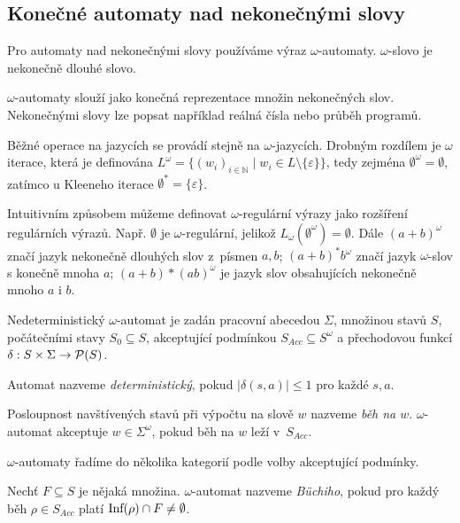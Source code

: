 \subsection{Konečné automaty nad nekonečnými slovy}


Pro automaty nad nekonečnými slovy používáme výraz $\omega$-automaty.
$\omega$-slovo je nekonečně dlouhé slovo.

$\omega$-automaty slouží jako konečná reprezentace množin nekonečných
slov. Nekonečnými slovy lze popsat například reálná čísla nebo průběh
programů.

Běžné operace na jazycích se provádí stejně na $\omega$-jazycích.
Drobným rozdílem je $\omega$ iterace, která je definována
$L^\omega = \{ (w_i)_{i \in \mathbb{N}} \mid w_i \in L \setminus \{ \varepsilon \} \}$,
tedy zejména
$\emptyset^\omega = \emptyset$, zatímco u Kleeneho iterace
$\emptyset^* = \{ \varepsilon \}$.

\begin{example}
    Intuitivním způsobem můžeme definovat
    $\omega$-regulární výrazy jako rozšíření regulárních výrazů.
    Např. $\emptyset$ je $\omega$-regulární, jelikož
    $L_\omega(\emptyset^\omega) = \emptyset$.
    Dále $(a+b)^\omega$ značí jazyk nekonečně dlouhých slov z~písmen
    $a,b$;
    $(a+b)^*b^\omega$ značí jazyk $\omega$-slov s konečně mnoha $a$;
    $(a+b)*(ab)^\omega$ je jazyk slov obsahujících nekonečně mnoho $a$ i $b$.
\end{example}

\begin{definition}
    Nedeterministický $\omega$-automat je zadán
    pracovní abecedou $\Sigma$,
    množinou stavů $S$,
    počátečními stavy $S_0 \subseteq S$,
    akceptující podmínkou $S_{Acc} \subseteq S^\omega$
    a přechodovou funkcí $\delta : S \times \Sigma \to \mathcal{P}(S)$.
\end{definition}

Automat nazveme {\em deterministický}, pokud
$\lvert \delta(s,a) \rvert \leq 1$ pro každé $s,a$.

Posloupnost navštívených stavů při výpočtu na slově $w$ nazveme {\em běh
na $w$}.
$\omega$-automat akceptuje $w \in \Sigma^\omega$,
pokud běh na $w$ leží v~$S_{Acc}$.

$\omega$-automaty řadíme do několika kategorií podle volby akceptující
podmínky.

\begin{definition}
    Nechť $F \subseteq S$ je nějaká množina.
    $\omega$-automat nazveme {\em Büchiho},
    pokud pro každý běh $\rho \in S_{Acc}$ platí
    $\text{Inf}(\rho) \cap F \neq \emptyset$.
\end{definition}

